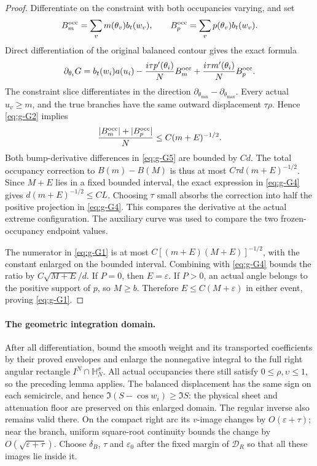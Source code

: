 \documentclass[11pt]{article}
\numberwithin{equation}{section}
\theoremstyle{remark}\newtheorem{remark}[theorem]{Remark}
\begin{document}
\begin{proof}
Differentiate on the constraint with both occupancies varying, and set
\[
 B_m^{\rm occ}=\sum_v m(\theta_v)b_t(w_v),\qquad
 B_p^{\rm occ}=\sum_v p(\theta_v)b_t(w_v).
\]
Direct differentiation of the original balanced contour gives
the exact formula
\begin{equation}\label{eq:g-G5}
\partial_{\theta_i}G
 =b_t(w_i)a(u_i)
 -\frac{i\tau p'(\theta_i)}N B_m^{\rm occ}
 +\frac{i\tau m'(\theta_i)}N B_p^{\rm occ}.
\end{equation}
The constraint slice differentiates in the direction
$\partial_{\theta_{\min}}-\partial_{\theta_{\max}}$.
Every actual $u_v\ge m$, and the true branches have the same
outward displacement $\tau\rho$.  Hence \eqref{eq:g-G2} implies
\[
 \frac{|B_m^{\rm occ}|+|B_p^{\rm occ}|}{N}
 \le C(m+E)^{-1/2}.
\]
Both bump-derivative differences in \eqref{eq:g-G5} are bounded by $Cd$.
The total occupancy correction to $B(m)-B(M)$ is thus at most
$C\tau d(m+E)^{-1/2}$.
Since $M+E$ lies in a fixed bounded interval, the exact
expression in \eqref{eq:g-G4} gives
$d(m+E)^{-1/2}\le CL$.  Choosing $\tau$ small absorbs the
correction into half the positive projection in \eqref{eq:g-G4}.
This compares the derivative at the actual extreme configuration.
The auxiliary curve was used to compare the two frozen-occupancy
endpoint values.

The numerator in \eqref{eq:g-G1} is at most
$C[(m+E)(M+E)]^{-1/2}$, with the constant enlarged on the bounded interval.
Combining with \eqref{eq:g-G4} bounds the ratio by $C\sqrt{M+E}/d$.
If $P=0$, then $E=\varepsilon$.  If $P>0$, an actual angle
belongs to the positive support of $p$, so $M\ge b$.
Therefore $E\le C(M+\varepsilon)$ in either event, proving
\eqref{eq:g-G1}.
\end{proof}



\paragraph{The geometric integration domain.}\label{par:right-rectangle}
After all differentiation, bound the smooth weight and its
transported coefficients by their proved envelopes and enlarge
the nonnegative integral to the full right angular rectangle
$I^N\cap\mathbb H_N^\sigma$. All actual occupancies there still satisfy
$0\le\rho,\upsilon\le1$, so the preceding lemma applies.
The balanced displacement has the same sign on each semicircle,
and hence $\Im(S-\cos w_i)\ge\Im S$: the physical sheet and
attenuation floor are preserved on this enlarged domain.
The regular inverse also remains valid there. On the compact
right arc its $v$-image changes by $O(\varepsilon+\tau)$;
near the branch, uniform square-root continuity bounds the
change by $O(\sqrt{\varepsilon+\tau})$. Choose $\delta_B$,
$\tau$ and $\varepsilon_0$ after the fixed margin of
$\mathcal D_R$ so that all these images lie inside it.
\end{document}
